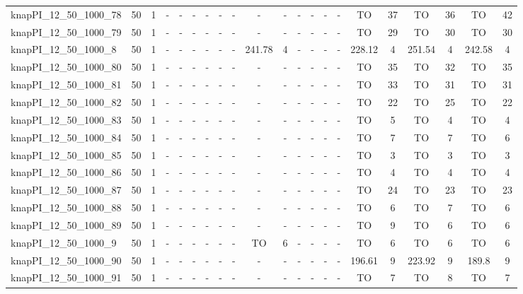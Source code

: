 \begin{sidewaystable}[!ht]
{\begin{tabular}{lcccccccccccccccccccc}
knapPI\_12\_50\_1000\_78 & 50 & 1 &  - &  - &  - &  - &  - &  - &  - &  - &  - &  - &  - &  - & TO & 37 & TO & 36 & TO & 42 \\
knapPI\_12\_50\_1000\_79 & 50 & 1 &  - &  - &  - &  - &  - &  - &  - &  - &  - &  - &  - &  - & TO & 29 & TO & 30 & TO & 30 \\
knapPI\_12\_50\_1000\_8 & 50 & 1 &  - &  - &  - &  - &  - &  - & 241.78 & 4 &  - &  - &  - &  - & 228.12 & 4 & 251.54 & 4 & 242.58 & 4 \\
knapPI\_12\_50\_1000\_80 & 50 & 1 &  - &  - &  - &  - &  - &  - &  - &  - &  - &  - &  - &  - & TO & 35 & TO & 32 & TO & 35 \\
knapPI\_12\_50\_1000\_81 & 50 & 1 &  - &  - &  - &  - &  - &  - &  - &  - &  - &  - &  - &  - & TO & 33 & TO & 31 & TO & 31 \\
knapPI\_12\_50\_1000\_82 & 50 & 1 &  - &  - &  - &  - &  - &  - &  - &  - &  - &  - &  - &  - & TO & 22 & TO & 25 & TO & 22 \\
knapPI\_12\_50\_1000\_83 & 50 & 1 &  - &  - &  - &  - &  - &  - &  - &  - &  - &  - &  - &  - & TO & 5 & TO & 4 & TO & 4 \\
knapPI\_12\_50\_1000\_84 & 50 & 1 &  - &  - &  - &  - &  - &  - &  - &  - &  - &  - &  - &  - & TO & 7 & TO & 7 & TO & 6 \\
knapPI\_12\_50\_1000\_85 & 50 & 1 &  - &  - &  - &  - &  - &  - &  - &  - &  - &  - &  - &  - & TO & 3 & TO & 3 & TO & 3 \\
knapPI\_12\_50\_1000\_86 & 50 & 1 &  - &  - &  - &  - &  - &  - &  - &  - &  - &  - &  - &  - & TO & 4 & TO & 4 & TO & 4 \\
knapPI\_12\_50\_1000\_87 & 50 & 1 &  - &  - &  - &  - &  - &  - &  - &  - &  - &  - &  - &  - & TO & 24 & TO & 23 & TO & 23 \\
knapPI\_12\_50\_1000\_88 & 50 & 1 &  - &  - &  - &  - &  - &  - &  - &  - &  - &  - &  - &  - & TO & 6 & TO & 7 & TO & 6 \\
knapPI\_12\_50\_1000\_89 & 50 & 1 &  - &  - &  - &  - &  - &  - &  - &  - &  - &  - &  - &  - & TO & 9 & TO & 6 & TO & 6 \\
knapPI\_12\_50\_1000\_9 & 50 & 1 &  - &  - &  - &  - &  - &  - & TO & 6 &  - &  - &  - &  - & TO & 6 & TO & 6 & TO & 6 \\
knapPI\_12\_50\_1000\_90 & 50 & 1 &  - &  - &  - &  - &  - &  - &  - &  - &  - &  - &  - &  - & 196.61 & 9 & 223.92 & 9 & 189.8 & 9 \\
knapPI\_12\_50\_1000\_91 & 50 & 1 &  - &  - &  - &  - &  - &  - &  - &  - &  - &  - &  - &  - & TO & 7 & TO & 8 & TO & 7 \\

\end{tabular}}
\end{sidewaystable}
